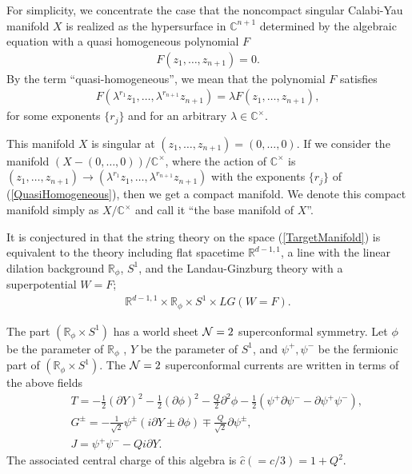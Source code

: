 \documentclass[a4paper,12pt]{article}
\numberwithin{equation}{section}
\newcommand{\Cb}{{\mathbb C}}
\newcommand{\Cx}{{\mathbb C}^{\times}}
\newcommand{\Ncal}{{\cal N}}
\newcommand{\del}{\partial}
\newcommand{\ch}{\hat{c}}
\newcommand{\Rb}{{\mathbb R}}
\newcommand{\nn}{\nonumber}
\begin{document}
For simplicity, we concentrate the case that the noncompact
 singular Calabi-Yau manifold $X$ is realized as the 
hypersurface in $\Cb^{n+1}$ determined by the algebraic equation
with a quasi homogeneous polynomial $F$
\begin{eqnarray*}
 F(z_1,\dots,z_{n+1})=0.
\end{eqnarray*}
By the term ``quasi-homogeneous'',
we mean that the polynomial $F$ satisfies
\begin{eqnarray}
 F(\lambda^{r_1}z_1,\dots,\lambda^{r_{n+1}}z_{n+1})=
\lambda F(z_1,\dots,z_{n+1}),\label{QuasiHomogeneous}
\end{eqnarray}
for some exponents $\{r_j\}$ and for an arbitrary $\lambda\in \Cx$.

This manifold $X$ is singular at $(z_1,\dots,z_{n+1})=(0,\dots,0)$.
If we consider the manifold $(X-{(0,\dots,0)})/\Cx$,
where the action of $\Cx$ is $(z_1,\dots,z_{n+1})\to
(\lambda^{r_1}z_1,\dots,\lambda^{r_{n+1}}z_{n+1})$ with the exponents
$\{r_j\}$ of (\ref{QuasiHomogeneous}), then we get a compact manifold.
We denote this compact manifold simply as $X/\Cx$ and call it
``the base manifold of $X$''.

It is conjectured in \cite{GKP9907} that the string theory 
on the space (\ref{TargetManifold}) is equivalent
to the theory including flat spacetime $\Rb^{d-1,1}$, a line with
the linear dilation background $\Rb_{\phi}$, $S^1$, and the Landau-Ginzburg
theory with a superpotential $W=F$;
\begin{eqnarray*}
  \Rb^{d-1,1}\times \Rb_{\phi} \times S^1 \times LG(W=F).
\end{eqnarray*} 

The part $(\Rb_{\phi} \times S^1)$ has a world sheet $\Ncal=2$
superconformal symmetry. 
Let $\phi$ be the parameter of $\Rb_{\phi}$ , $Y$ be the parameter of
$S^1$, and $\psi^{+},\psi^{-}$ be the fermionic part 
of $(\Rb_{\phi} \times S^1)$.
The $\Ncal=2$ superconformal currents are written in terms of
 the above fields
\begin{eqnarray}
 && T=-\frac12(\del Y)^2-\frac12(\del\phi)^2-\frac Q2 \del^2 \phi
-\frac12(\psi^{+}\del\psi^{-}-\del \psi^{+}\psi^{-}),\nn\\
 &&G^{\pm}=-\frac{1}{\sqrt 2}\psi^{\pm}(i\del Y\pm\del\phi)\mp
\frac{Q}{\sqrt2}\del\psi^{\pm},\nn\\
 && J=\psi^{+}\psi^{-}- Qi\del Y. \label{LiouvilleSCA}
\end{eqnarray}
The associated central charge of this algebra is $\ch(=c/3)=1+Q^2$.
\end{document}
